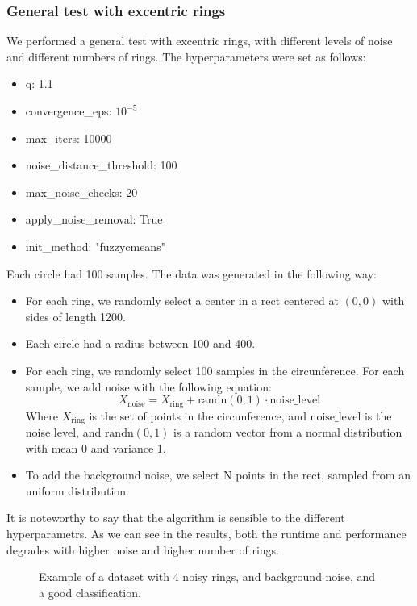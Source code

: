 \documentclass[conference]{IEEEtran}
\begin{document}
\subsubsection{General test with excentric rings}
We performed a general test with excentric rings, with different levels of noise and different numbers of rings.
The hyperparameters were set as follows:

\begin{itemize}
    \item q: 1.1
    \item convergence\_eps: $10^{-5}$
    \item max\_iters: 10000
    \item noise\_distance\_threshold: 100
    \item max\_noise\_checks: 20
    \item apply\_noise\_removal: True
    \item init\_method: "fuzzycmeans"
\end{itemize}

Each circle had 100 samples.
The data was generated in the following way:
\begin{itemize}
    \item For each ring, we randomly select a center in a rect centered at $(0, 0)$ with sides of length 1200.
    \item Each circle had a radius between 100 and 400.
    \item For each ring, we randomly select 100 samples in the circunference. For each sample, we add noise with the following equation:
    \begin{equation}
        X_{\text{noise}} = X_{\text{ring}} + \text{randn}(0, 1) \cdot \text{noise\_level}
    \end{equation}
    Where $X_{\text{ring}}$ is the set of points in the circunference, and $\text{noise\_level}$ is the noise level, and $\text{randn}(0, 1)$ is a random vector from a normal distribution with mean 0 and variance 1.
    \item To add the background noise, we select N points in the rect, sampled from an uniform distribution.
\end{itemize}

It is noteworthy to say that the algorithm is sensible to the different hyperparametrs.
As we can see in the results, both the runtime and performance degrades with higher noise and higher number of rings.
\begin{figure}[t]
    \centering
    \resizebox{0.9\linewidth}{!}{}
    \label{fig:excentric_rings}
    \caption{Example of a dataset with 4 noisy rings, and background noise, and a good classification.}
\end{figure}
\end{document}
